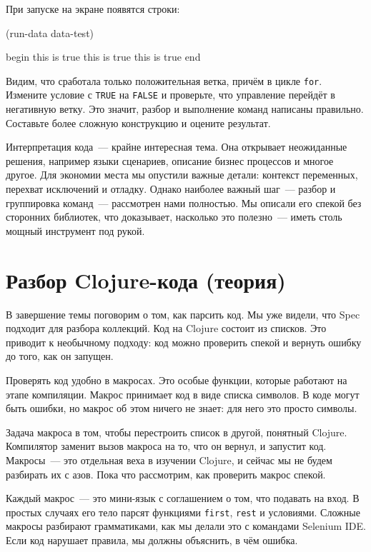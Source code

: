 При запуске на экране появятся строки:

\begin{english}
  \begin{clojure}
(run-data data-test)

begin
this is true
this is true
this is true
end
  \end{clojure}
\end{english}

Видим, что сработала только положительная ветка, причём в цикле
\texttt{for}. Измените условие с \verb|TRUE| на \verb|FALSE| и проверьте, что
управление перейдёт в негативную ветку. Это значит, разбор и выполнение команд
написаны правильно. Составьте более сложную конструкцию и оцените результат.

Интерпретация кода~--- крайне интересная тема. Она открывает неожиданные
решения, например языки сценариев, описание бизнес процессов и многое
другое. Для экономии места мы опустили важные детали: контекст переменных,
перехват исключений и отладку. Однако наиболее важный шаг~--- разбор и
группировка команд~--- рассмотрен нами полностью. Мы описали его спекой без
сторонних библиотек, что доказывает, насколько это полезно~--- иметь столь
мощный инструмент под рукой.

\section{Разбор Clojure-кода (теория)}


В завершение темы поговорим о том, как парсить код. Мы уже видели, что Spec
подходит для разбора коллекций. Код на Clojure состоит из списков. Это приводит
к необычному подходу: код можно проверить спекой и вернуть ошибку до того, как
он запущен.

Проверять код удобно в макросах. Это особые функции, которые работают на этапе
компиляции. Макрос принимает код в виде списка символов. В коде могут быть
ошибки, но макрос об этом ничего не знает: для него это просто символы.

Задача макроса в том, чтобы перестроить список в другой, понятный
Clojure. Компилятор заменит вызов макроса на то, что он вернул, и запустит
код. Макросы~--- это отдельная веха в изучении Clojure, и сейчас мы не будем
разбирать их с азов. Пока что рассмотрим, как проверить макрос спекой.

Каждый макрос~--- это мини-язык с соглашением о том, что подавать на вход. В
простых случаях его тело парсят функциями \verb|first|, \verb|rest| и
условиями. Сложные макросы разбирают грамматиками, как мы делали это с командами
Selenium IDE. Если код нарушает правила, мы должны объяснить, в чём ошибка.

